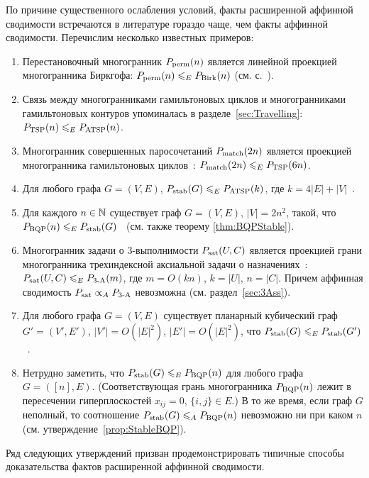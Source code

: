 По причине существенного ослабления условий, факты расширенной аффинной сводимости встречаются в литературе гораздо чаще, чем факты аффинной сводимости.
Перечислим несколько известных примеров:
\begin{enumerate}
	\item Перестановочный многогранник $P_{\textup{perm}}(n)$ является линейной проекцией многогранника Биркгофа: $P_{\textup{perm}}(n) \leqslant_E P_{\textup{Birk}}(n)$ (см. с.~\pageref{Perm2Birk}).
	\item Связь между многогранниками гамильтоновых циклов и многогранниками гамильтоновых контуров упоминалась в разделе~\ref{sec:Travelling}:
	$P_{\textup{TSP}}(n) \leqslant_E P_{\textup{ATSP}}(n)$.
	\item Многогранник совершенных паросочетаний $P_{\textup{match}}(2n)$ является проекцией многогранника гамильтоновых циклов~\cite{Yannakakis:1991}: $P_{\textup{match}}(2n) \leqslant_E P_{\textup{TSP}}(6n)$.
	\item Для любого графа $G=(V,E)$, $P_{\textup{stab}}(G) \leqslant_E P_{\textup{ATSP}}(k)$, где $k = 4 |E| + |V|$~\cite{Yannakakis:1991}.
	\item Для каждого $n\in \mathbb{N}$ существует граф $G = (V,E)$, $|V| = 2n^2$, такой, что $P_{\textup{BQP}}(n) \leqslant_E P_{\textup{stab}}(G)$~\cite{FioriniPokutta:2015} (см. также теорему \ref{thm:BQPStable}).
	\item Многогранник задачи о 3-выполнимости $P_{\textup{sat}}(U,C)$ является проекцией грани многогранника трехиндексной аксиальной задачи о назначениях~\cite{AvisTiwary:2015}: $P_{\textup{sat}}(U,C) \leqslant_E P_{\textup{3-A}}(m)$, где $m = O(kn)$, $k=|U|$, $n=|C|$. Причем аффинная сводимость $P_{\textup{sat}} \propto_A P_{\textup{3-A}}$ невозможна (см. раздел~\ref{sec:3Ass}).
	\item Для любого графа $G=(V,E)$ существует планарный кубический граф $G'=(V',E')$, $|V'| = O(|E|^2)$, $|E'| = O(|E|^2)$, что $P_{\textup{stab}}(G) \leqslant_E P_{\textup{stab}}(G')$~\cite{AvisTiwary:2015}.
	\item Нетрудно заметить, что $P_{\textup{stab}}(G) \leqslant_E P_{\textup{BQP}}(n)$ для любого графа $G = ([n],E)$. (Соответствующая грань многогранника $P_{\textup{BQP}}(n)$ лежит в пересечении гиперплоскостей $x_{ij} = 0$, $\{i,j\} \in E$.) В то же время,	если граф $G$ неполный, то соотношение $P_{\textup{stab}}(G) \leqslant_A P_{\textup{BQP}}(n)$ невозможно ни при каком $n$ (см. утверждение~\ref{prop:StableBQP}).
\end{enumerate}

Ряд следующих утверждений призван продемонстрировать типичные способы доказательства фактов расширенной аффинной сводимости. 

